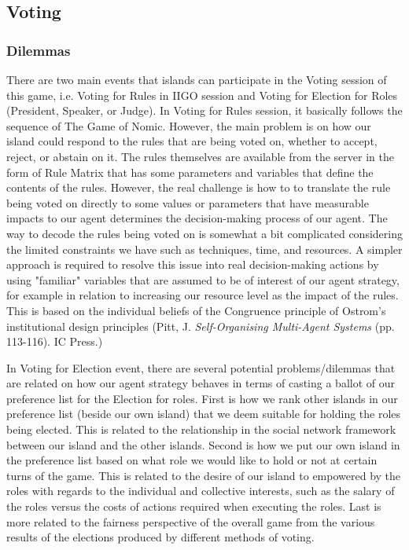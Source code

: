 \subsection{Voting} \label{subsec:Team6_Voting}
\subsubsection{Dilemmas} \label{subsubsec:Team6_Voting:Dilemma}
There are two main events that islands can participate in the Voting session of this game, i.e. Voting for Rules in IIGO session and Voting for Election for Roles (President, Speaker, or Judge). In Voting for Rules session, it basically follows the sequence of The Game of Nomic. However, the main problem is on how our island could respond to the rules that are being voted on, whether to accept, reject, or abstain on it. The rules themselves are available from the server in the form of Rule Matrix that has some parameters and variables that define the contents of the rules. However, the real challenge is how to to translate the rule being voted on directly to some values or parameters that have measurable impacts to our agent determines the decision-making process of our agent. The way to decode the rules being voted on is somewhat a bit complicated considering the limited constraints we have such as techniques, time, and resources. A simpler approach is required to resolve this issue into real decision-making actions by using "familiar" variables that are assumed to be of interest of our agent strategy, for example in relation to increasing our resource level as the impact of the rules. This is based on the individual beliefs of the Congruence principle of Ostrom's institutional design principles (Pitt, J. \textit{Self-Organising Multi-Agent Systems} (pp. 113-116). IC Press.)

In Voting for Election event, there are several potential problems/dilemmas that are related on how our agent strategy behaves in terms of casting a ballot of our preference list for the Election for roles. First is how we rank other islands in our preference list (beside our own island) that we deem suitable for holding the roles being elected. This is related to the relationship in the social network framework between our island and the other islands. Second is how we put our own island in the preference list based on what role we would like to hold or not at certain turns of the game. This is related to the desire of our island to empowered by the roles with regards to the individual and collective interests, such as the salary of the roles versus the costs of actions required when executing the roles. Last is more related to the fairness perspective of the overall game from the various results of the elections produced by different methods of voting.

